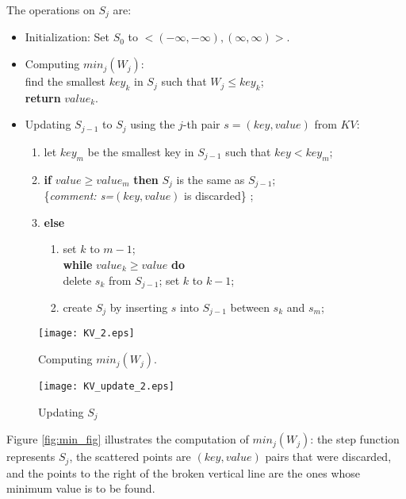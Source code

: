 The operations on $S_j$ are:
\begin{itemize}
	\item  Initialization: Set $S_0$ to $<(-\infty,-\infty), (\infty,\infty)>$.
	\item  Computing $min_j(W_j)$:\\
	find the smallest $key_{k}$ in $S_{j}$ such that 
	$W_j\leq key_{k}$;\\  \textbf{return} $value_{k}$.\\
	\item Updating $S_{j-1}$ to $S_j$ using the $j$-th pair $s=(key, value)$ from $KV$:
	\begin{enumerate}
		\item let $key_{m}$ be the smallest key in $S_{j-1}$ such that 
		$key < key_{m}$;
		\item {\bf if} $value\geq value_{m}$ \textbf{then} $S_j $ is the same as $S_{j-1}$;\\
		\{\emph{comment:  s=$(key,value)$ } is discarded\} ; \label{i.discard}
		\item \textbf{else} \label{i.else}
		  \begin{enumerate}
		  	\item set $k$ to $m-1$;\\  \textbf{while} $value_k \geq value $ \textbf{do} \\
		  		delete $s_k$ from $S_{j-1}$; set $k$ to  $k-1$;\label{i.while}
		  	\item  create $S_j$ by inserting $ s$ into $S_{j-1}$ between $s_k$ and $s_m$;
		  	\label{i.insert}
		  \end{enumerate} 
	\end{enumerate}
\end{itemize}
\begin{figure}[h]
	\centering
	\begin{minipage}{0.45\textwidth}
		\centering  
		\texttt{[image: KV\_2.eps]}
		\caption{Computing $min_j(W_j)$.}\label{fig:min_fig}
	\end{minipage}\hfill
	\begin{minipage}{0.45\textwidth}
		\centering 
		\texttt{[image: KV\_update\_2.eps]}
		\caption{Updating $S_j$}\label{fig:update_fig}
	\end{minipage}
\end{figure}
Figure  \ref{fig:min_fig} illustrates the computation of $min_j(W_j)$: the step function represents 
$S_j$, the scattered points are $(key, value)$ pairs that were discarded, and the points to the right
of the broken vertical line are the ones whose minimum value is to be found.

